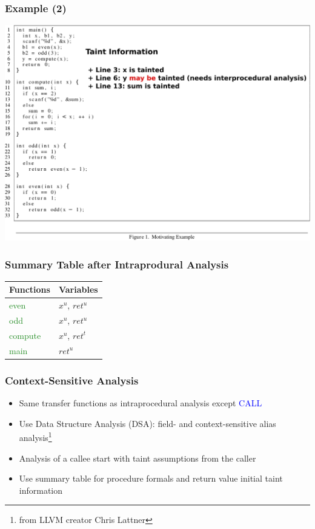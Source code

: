 \documentclass[xcolor=dvipsnames]{beamer}
\begin{document}
\begin{frame}
  \frametitle{Example (2)} 
    {\small
    \begin{center}
	\includegraphics[scale=0.6]{example-explained}   	
	\end{center}   
	}
\end{frame}


\begin{frame}
  \frametitle{Summary Table after Intraprodural Analysis} 
	\Large
\begin{center}
\begin{tabular}{|l|l|}
\hline
Functions 							& 	Variables 					\\ \hline
\hline
\textcolor{forestgreen}{even}		& 	$x^u$, $\mathit{ret}^u$		\\	\hline
\textcolor{forestgreen}{odd}		& 	$x^u$, $\mathit{ret}^u$		\\ 	\hline
\textcolor{forestgreen}{compute}	& 	$x^u$, $\mathit{ret}^t$		\\ 	\hline
\textcolor{forestgreen}{main}		& 	$ret^u$						\\ 	\hline
\end{tabular}
\end{center}    	
\end{frame}

\begin{frame}
  \frametitle{Context-Sensitive Analysis} {
   \large
   \begin{itemize}
   \item Same transfer functions as intraprocedural analysis except \textcolor{blue}{CALL}
	\vspace{0.2cm}   
   \item Use Data Structure Analysis (DSA): field- and context-sensitive alias
   analysis\footnote{from LLVM creator Chris Lattner}
	\vspace{0.2cm}   
   \item Analysis of a callee start with taint assumptions from the caller
	\vspace{0.2cm}      
   \item Use summary table for procedure formals and return value initial taint information
   
	\end{itemize}
	}
\end{frame}
\end{document}
